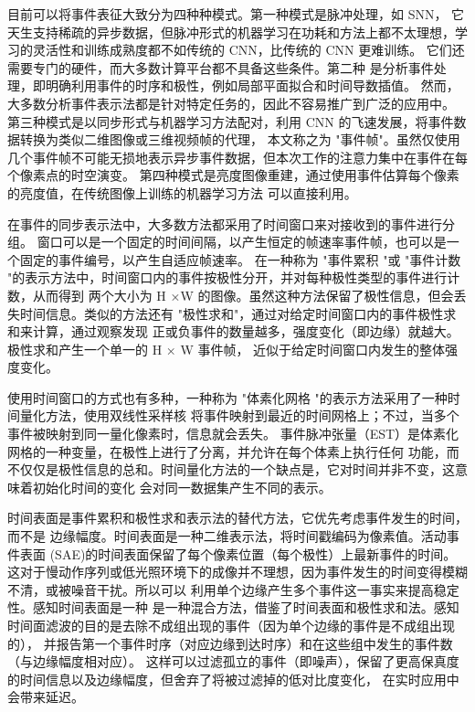 目前可以将事件表征大致分为四种种模式。第一种模式是脉冲处理，如 SNN，
它天生支持稀疏的异步数据，但脉冲形式的机器学习在功耗和方法上都不太理想，学习的灵活性和训练成熟度都不如传统的 CNN，比传统的 CNN 更难训练。
它们还需要专门的硬件，而大多数计算平台都不具备这些条件。第二种
是分析事件处理，即明确利用事件的时序和极性，例如局部平面拟合和时间导数插值。
然而，大多数分析事件表示法都是针对特定任务的，因此不容易推广到广泛的应用中。
第三种模式是以同步形式与机器学习方法配对，利用 CNN 的飞速发展，将事件数据转换为类似二维图像或三维视频帧的代理，
本文称之为 "事件帧"。虽然仅使用几个事件帧不可能无损地表示异步事件数据，但本次工作的注意力集中在事件在每个像素点的时空演变。
第四种模式是亮度图像重建，通过使用事件估算每个像素的亮度值，在传统图像上训练的机器学习方法
可以直接利用。\cite{baldwin2022time}

在事件的同步表示法中，大多数方法都采用了时间窗口来对接收到的事件进行分组。
窗口可以是一个固定的时间间隔，以产生恒定的帧速率事件帧，也可以是一个固定的事件编号，以产生自适应帧速率。
在一种称为 "事件累积 "或 "事件计数 "的表示方法中，时间窗口内的事件按极性分开，并对每种极性类型的事件进行计数，从而得到
两个大小为 H ×W 的图像。虽然这种方法保留了极性信息，但会丢失时间信息。类似的方法还有 "极性求和"，通过对给定时间窗口内的事件极性求和来计算，通过观察发现
正或负事件的数量越多，强度变化（即边缘）就越大。极性求和产生一个单一的 H × W 事件帧，
近似于给定时间窗口内发生的整体强度变化。

使用时间窗口的方式也有多种，一种称为 "体素化网格 "的表示方法采用了一种时间量化方法，使用双线性采样核
将事件映射到最近的时间网格上；不过，当多个事件被映射到同一量化像素时，信息就会丢失。
事件脉冲张量（EST）是体素化网格的一种变量，在极性上进行了分离，并允许在每个体素上执行任何
功能，而不仅仅是极性信息的总和。时间量化方法的一个缺点是，它对时间并非不变，这意味着初始化时间的变化
会对同一数据集产生不同的表示。

时间表面是事件累积和极性求和表示法的替代方法\cite{benosman2013event}，它优先考虑事件发生的时间，而不是
边缘幅度。时间表面是一种二维表示法，将时间戳编码为像素值。活动事件表面
(SAE)的时间表面保留了每个像素位置（每个极性）上最新事件的时间。
这对于慢动作序列或低光照环境下的成像并不理想，因为事件发生的时间变得模糊不清，或被噪音干扰。所以可以
利用单个边缘产生多个事件这一事实来提高稳定性。感知时间表面是一种
是一种混合方法，借鉴了时间表面和极性求和法。感知时间面滤波的目的是去除不成组出现的事件（因为单个边缘的事件是不成组出现的），
并报告第一个事件时序（对应边缘到达时序）和在这些组中发生的事件数（与边缘幅度相对应）。
这样可以过滤孤立的事件（即噪声），保留了更高保真度的时间信息以及边缘幅度，但舍弃了将被过滤掉的低对比度变化，
在实时应用中会带来延迟。

